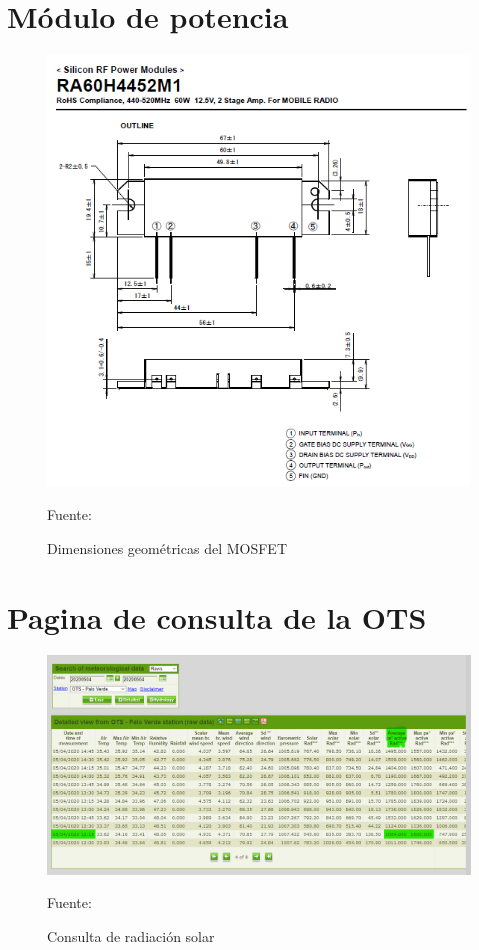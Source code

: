 
\renewcommand{\appendixname}{Apéndice}
\renewcommand{\appendixtocname}{Apéndices}
\renewcommand{\appendixpagename}{Apéndices}
\appendix

\chapter{Módulo de potencia}

\begin{figure}[H]
\centering
\includegraphics[scale=1]{Figuras/anexo1.png}
\caption{Dimensiones geométricas del MOSFET}
Fuente:\cite{manual}
\label{anexo1}
\end{figure}

\chapter{Pagina de consulta de la OTS}

\begin{figure}[H]
\centering
\includegraphics[scale=0.48]{Figuras/radiacion.png}
\caption{Consulta de radiación solar }
Fuente:\cite{ots}
\label{anexo9}
\end{figure}

